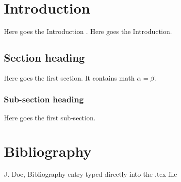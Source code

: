 \documentclass[11]{book}
\begin{document}
\frontmatter


\mainmatter
\chapter{Introduction}\label{S-1}
Here goes the Introduction \cite{citekey}. 
Here goes the Introduction. 

\section{Section heading}\label{S-1-1}
Here goes the first section. It contains math $\alpha=\beta$.

\subsection{Sub-section heading}
Here goes the first sub-section. 

\chapter{Bibliography}%
\begin{thebibliography}{9}
 J. Doe, Bibliography entry typed directly into the .tex file
\end{thebibliography}
\printindex
\end{document}
